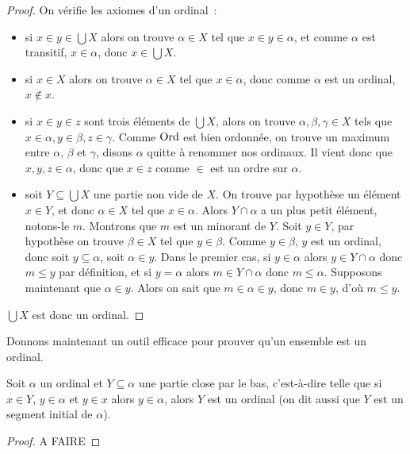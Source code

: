 \begin{proof}
  On vérifie les axiomes d'un ordinal~:
  \begin{itemize}
  \item si $x\in y\in \bigcup X$ alors on trouve $\alpha \in X$ tel que
    $x\in y \in \alpha$, et comme $\alpha$ est transitif, $x\in \alpha$, donc
    $x\in \bigcup X$.
  \item si $x\in X$ alors on trouve $\alpha \in X$ tel que $x\in \alpha$, donc
    comme $\alpha$ est un ordinal, $x\notin x$.
  \item si $x\in y\in z$ sont trois éléments de $\bigcup X$, alors on trouve
    $\alpha,\beta,\gamma\in X$ tels que $x\in \alpha,y\in \beta,z\in\gamma$.
    Comme $\operatorname{Ord}$ est bien ordonnée, on trouve un maximum entre $\alpha$,
    $\beta$ et $\gamma$, disons $\alpha$ quitte à renommer nos ordinaux.
    Il vient donc que $x,y,z\in\alpha$, donc que $x\in z$ comme $\in$
    est un ordre sur $\alpha$.
  \item soit $Y\subseteq \bigcup X$ une partie non vide de $X$. On trouve par
    hypothèse un élément $x\in Y$, et donc $\alpha \in X$ tel que $x\in\alpha$.
    Alors $Y\cap \alpha$ a un plus petit élément, notons-le $m$. Montrons que
    $m$ est un minorant de $Y$. Soit $y\in Y$, par hypothèse on trouve
    $\beta\in X$ tel que $y\in \beta$. Comme $y\in \beta$, $y$ est un ordinal,
    donc soit $y\subseteq \alpha$, soit $\alpha \in y$. Dans le premier cas,
    si $y\in \alpha$ alors $y\in Y \cap \alpha$ donc $m \leq y$ par définition,
    et si $y=\alpha$ alors $m\in Y \cap \alpha$ donc $m \leq \alpha$.
    Supposons maintenant que $\alpha \in y$. Alors on sait que
    $m\in \alpha\in y$, donc $m\in y$, d'où $m\leq y$.
  \end{itemize}

  $\bigcup X$ est donc un ordinal.
\end{proof}

Donnons maintenant un outil efficace pour prouver qu'un ensemble est un ordinal.

\begin{proposition}
  Soit $\alpha$ un ordinal et $Y\subseteq \alpha$ une partie close par le bas,
  c'est-à-dire telle que si $x\in Y$, $y\in \alpha$ et $y\in x$ alors
  $y\in \alpha$, alors $Y$ est un ordinal (on dit aussi que $Y$ est un segment
  initial de $\alpha$).
\end{proposition}

\begin{proof}
  A FAIRE
\end{proof}

